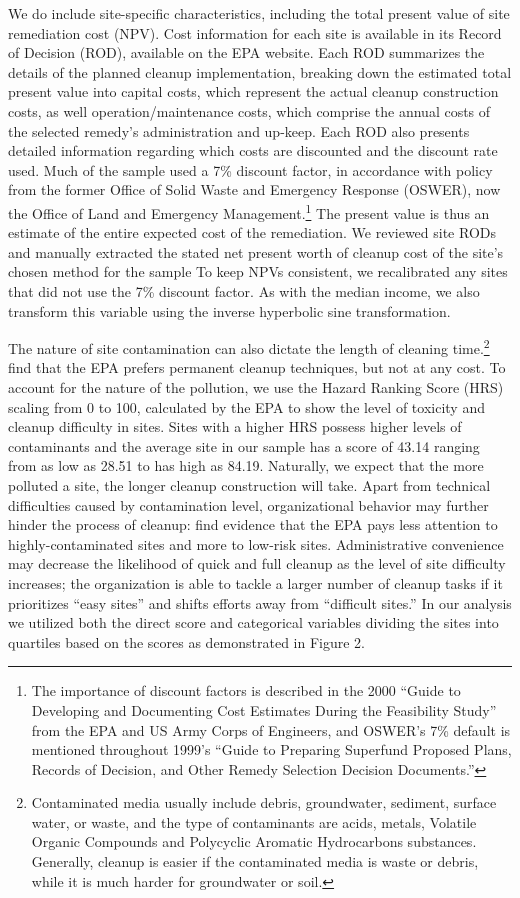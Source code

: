 \documentclass[12pt]{article}
\begin{document}
{We do include site-specific characteristics, including the total present value of site remediation cost (NPV). Cost information for each site is available in its Record of Decision (ROD), available on the EPA website. Each ROD summarizes the details of the planned cleanup implementation, breaking down the estimated total present value into capital costs, which represent the actual cleanup construction costs, as well operation/maintenance costs, which comprise the annual costs of the selected remedy's administration and up-keep. Each ROD also presents detailed information regarding which costs are discounted and the discount rate used. Much of the sample used a 7\% discount factor, in accordance with policy from the former Office of Solid Waste and Emergency Response (OSWER), now the Office of Land and Emergency Management.\footnote{The importance of discount factors is described in the 2000 ``Guide to Developing and Documenting Cost Estimates During the Feasibility Study'' from the EPA and US Army Corps of Engineers, and OSWER's 7\% default is mentioned throughout 1999's ``Guide to Preparing Superfund Proposed Plans, Records of Decision, and Other Remedy Selection Decision Documents.''} The present value is thus an estimate of the entire expected cost of the remediation. We reviewed site RODs and manually extracted the stated net present worth of cleanup cost of the site's chosen method for the sample {To keep NPVs consistent, we recalibrated any sites that did not use the 7\% discount factor.} As with the median income, we also transform this variable using the inverse hyperbolic sine transformation.

The nature of site contamination can also dictate the length of cleaning time.\footnote{Contaminated media usually include debris, groundwater, sediment, surface water, or waste, and the type of contaminants are acids, metals, Volatile Organic Compounds and Polycyclic Aromatic Hydrocarbons substances. Generally, cleanup is easier if the contaminated media is waste or debris, while it is much harder for groundwater or soil.} \textcite{Gupta1996} find that the EPA prefers permanent cleanup techniques, but not at any cost. To account for the nature of the pollution, we use the Hazard Ranking Score (HRS) scaling from 0 to 100, calculated by the EPA to show the level of toxicity and cleanup difficulty in sites. Sites with a higher HRS possess higher levels of contaminants and the average site in our sample has a score of 43.14 ranging from as low as 28.51 to has high as 84.19. Naturally, we expect that the more polluted a site, the longer cleanup construction will take. Apart from technical difficulties caused by contamination level, organizational behavior may further hinder the process of cleanup: \textcite{daley2004policy} find evidence that the EPA pays less attention to highly-contaminated sites and more to low-risk sites. Administrative convenience may decrease the likelihood of quick and full cleanup as the level of site difficulty increases; the organization is able to tackle a larger number of cleanup tasks if it prioritizes ``easy sites'' and shifts efforts away from ``difficult sites.'' In our analysis we utilized both the direct score and categorical variables dividing the sites into quartiles based on the scores as demonstrated in Figure 2.

}
\end{document}
